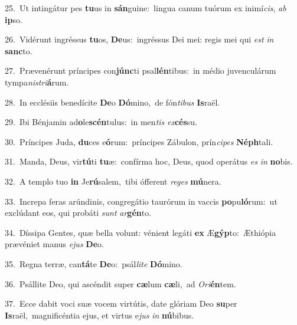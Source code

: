 {\numbfont\textcolor{\numbcolor}{25.}}~Ut intingátur pes \textbf{tu}\-us in \textbf{sán}\-guine:~\star lingua canum tuórum ex inimí\-\textit{cis}\-, \textit{ab} \textbf{ip}\-so.\par
{\numbfont\textcolor{\numbcolor}{26.}}~Vidérunt ingréssus \textbf{tu}\-os, \textbf{De}\-us:~\star ingréssus Dei mei: regis mei qui \textit{est} \textit{in} \textbf{sanc}\-to.\par
{\numbfont\textcolor{\numbcolor}{27.}}~Prævenérunt príncipes con\-\textbf{júnc}\-ti psal\-\textbf{lén}\-tibus:~\star in médio juvenculárum tympa\-\textit{nis}\-\textit{tri}\textbf{á}rum.\par
{\numbfont\textcolor{\numbcolor}{28.}}~In ecclésiis benedícite \textbf{De}\-o \textbf{Dó}\-mino,~\star de fón\-\textit{ti}\-\textit{bus} \textbf{Is}\-raël.\par
{\numbfont\textcolor{\numbcolor}{29.}}~Ibi Bénjamin ad\-\textbf{o}\-le\-\textbf{scén}\-tulus:~\star in men\textit{tis} \textit{ex}\-\textbf{cés}su.\par
{\numbfont\textcolor{\numbcolor}{30.}}~Príncipes Juda, \textbf{du}\-ces e\-\textbf{ó}\-rum:~\star príncipes Zábulon, prín\-\textit{ci}\-\textit{pes} \textbf{Néph}\-tali.\par
{\numbfont\textcolor{\numbcolor}{31.}}~Manda, Deus, vir\-\textbf{tú}\-ti \textbf{tu}\-æ:~\star confírma hoc, Deus, quod operátus \textit{es} \textit{in} \textbf{no}\-bis.\par
{\numbfont\textcolor{\numbcolor}{32.}}~A templo tuo \textbf{in} Je\-\textbf{rú}\-salem,~\star tibi ófferent \textit{re}\-\textit{ges} \textbf{mú}\-nera.\par
{\numbfont\textcolor{\numbcolor}{33.}}~Increpa feras arúndinis, congregátio taurórum in vaccis \textbf{po}\-pu\-\textbf{ló}\-rum:~\star ut exclúdant eos, qui probáti \textit{sunt} \textit{ar}\-\textbf{gén}to.\par
{\numbfont\textcolor{\numbcolor}{34.}}~Díssipa Gentes, quæ bella volunt: vénient legáti \textbf{ex} Æ\-\textbf{gýp}\-to:~\star Æthiópia prævéniet manus \textit{e}\-\textit{jus} \textbf{De}\-o.\par
{\numbfont\textcolor{\numbcolor}{35.}}~Regna terræ, can\-\textbf{tá}\-te \textbf{De}\-o:~\star psál\-\textit{li}\-\textit{te} \textbf{Dó}\-mino.\par
{\numbfont\textcolor{\numbcolor}{36.}}~Psállite Deo, qui ascéndit super \textbf{cæ}\-lum \textbf{cæ}\-li,~\star ad \textit{O}\-\textit{ri}\textbf{én}tem.\par
{\numbfont\textcolor{\numbcolor}{37.}}~Ecce dabit voci suæ vocem virtútis, date glóriam Deo \textbf{su}\-per \textbf{Is}\-raël,~\star magnificéntia ejus, et virtus e\textit{jus} \textit{in} \textbf{nú}\-bibus.\par
